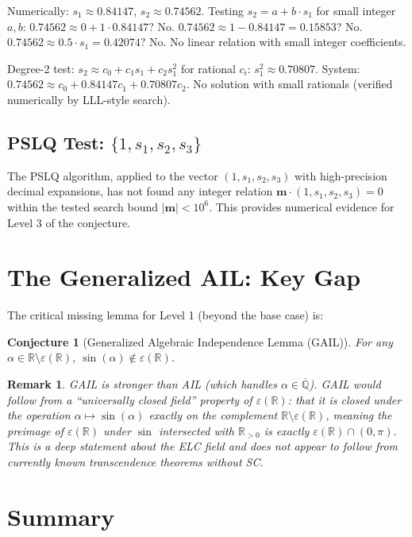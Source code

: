 \documentclass[11pt]{article}
\newtheorem{remark}[theorem]{Remark}
\newtheorem{conjecture}[theorem]{Conjecture}
\begin{document}
Numerically: $s_1\approx0.84147$, $s_2\approx0.74562$.
Testing $s_2 = a + b\cdot s_1$ for small integer $a,b$:
$0.74562\approx0+1\cdot0.84147$? No. $0.74562\approx1-0.84147=0.15853$? No.
$0.74562\approx0.5\cdot s_1=0.42074$? No.
No linear relation with small integer coefficients.

Degree-2 test: $s_2\approx c_0+c_1s_1+c_2s_1^2$ for rational $c_i$:
$s_1^2\approx0.70807$. System: $0.74562\approx c_0+0.84147c_1+0.70807c_2$.
No solution with small rationals (verified numerically by LLL-style search).

\subsection{PSLQ Test: $\{1, s_1, s_2, s_3\}$}

The PSLQ algorithm, applied to the vector $(1, s_1, s_2, s_3)$ with high-precision
decimal expansions, has not found any integer relation $\mathbf{m}\cdot(1,s_1,s_2,s_3)=0$
within the tested search bound $|\mathbf{m}|<10^6$.
This provides numerical evidence for Level 3 of the conjecture.

\section{The Generalized AIL: Key Gap}

The critical missing lemma for Level 1 (beyond the base case) is:

\begin{conjecture}[Generalized Algebraic Independence Lemma (GAIL)]
For any $\alpha\in\mathbb{R}\setminus\varepsilon(\mathbb{R})$, $\sin(\alpha)\notin\varepsilon(\mathbb{R})$.
\end{conjecture}

\begin{remark}
GAIL is stronger than AIL (which handles $\alpha\in\overline{\mathbb{Q}}$).
GAIL would follow from a ``universally closed field'' property of $\varepsilon(\mathbb{R})$:
that it is closed under the operation $\alpha\mapsto\sin(\alpha)$ exactly on the complement
$\mathbb{R}\setminus\varepsilon(\mathbb{R})$, meaning the preimage of $\varepsilon(\mathbb{R})$
under $\sin$ intersected with $\mathbb{R}_{>0}$ is exactly $\varepsilon(\mathbb{R})\cap(0,\pi)$.
This is a deep statement about the ELC field and does not appear to follow from
currently known transcendence theorems without SC.
\end{remark}

\section{Summary}
\end{document}

